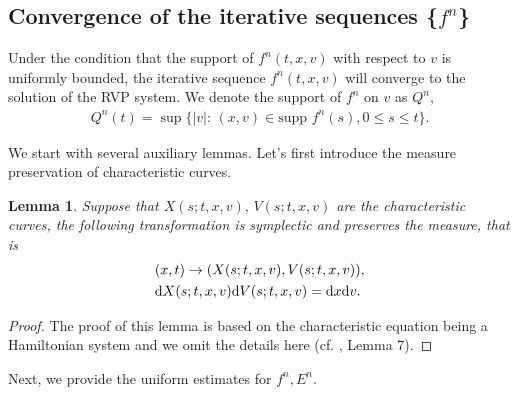 \documentclass[11pt,reqno]{amsart}%
\newtheorem{Lemma}{Lemma}[section]
\theoremstyle{definition}
\theoremstyle{remark}
\begin{document}
\subsection{Convergence of the iterative sequences  \{$f^{n}$\} }
 Under the condition that  the support of  $f^{n}(t,x,v)$ with respect to $v$ is uniformly bounded, the iterative sequence $f^{n}(t,x,v)$ will converge to
 the solution of the RVP system. We denote
 the support of  $f^{n}$ on $v$  as $Q^{n}$,
\begin{align}
 Q^{n}(t)=\sup\{|v|: \,(x,v)\in \text{supp } f^{n}(s), 0\leq s\leq t\}.\label{v5.17}
\end{align}

We start with several auxiliary lemmas.
Let's first introduce the measure preservation of characteristic curves.
\begin{Lemma}\label{L3}
Suppose that $X(s;t,x,v),\, V(s;t,x,v)$ are  the characteristic curves,
the following transformation is  symplectic and preserves the measure, that is
\begin{align}
&(x,t)\rightarrow (X(s;t,x,v), V(s;t,x,v)), \nonumber\\
&{\rm d}X(s;t,x,v){\rm d}V(s;t,x,v)={\rm d}x{\rm d}v.\nonumber
\end{align}
\end{Lemma}
\begin{proof}
The proof of this lemma  is based on the characteristic equation being a Hamiltonian system and we omit the details here (cf. \cite{HV}, Lemma 7).
\end{proof}

Next, we provide the uniform estimates for $f^{n}, E^{n}$.
\end{document}
